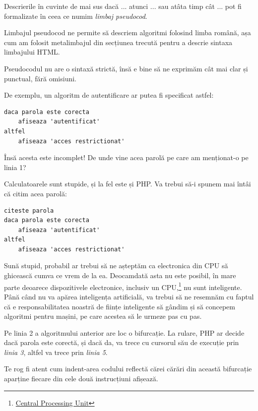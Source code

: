 Descrierile în cuvinte de mai sus {\glqq}dacă ... atunci ...{\grqq}
sau {\glqq}atâta timp cât ...{\grqq} pot fi formalizate în ceea
ce numim \textsl{limbaj pseudocod}. 

Limbajul pseudocod ne permite să descriem algoritmi
folosind limba română, așa cum am folosit metalimbajul
din secțiunea trecută pentru a descrie sintaxa limbajului HTML.

Pseudocodul nu are o sintaxă strictă, însă e bine să
ne exprimăm cât mai clar și punctual, fără omisiuni.

De exemplu, un algoritm de autentificare ar putea
fi specificat astfel:
\begin{lstlisting}[language=pseudocod]
daca parola este corecta
	afiseaza 'autentificat'
altfel
	afiseaza 'acces restrictionat'
\end{lstlisting}
Însă acesta este incomplet! De unde vine
acea {\glqq}parolă{\grqq} pe care am menționat-o pe linia 1?

Calculatoarele sunt stupide, și la fel este și PHP. Va
trebui să-i spunem mai întâi că citim acea parolă:
\begin{lstlisting}[language=pseudocod]
citeste parola
daca parola este corecta
	afiseaza 'autentificat'
altfel
	afiseaza 'acces restrictionat'
\end{lstlisting}

Sună stupid, probabil ar trebui să ne așteptăm
ca electronica din CPU să ghicească cumva
ce vrem de la ea. Deocamdată asta nu este posibil,
în mare parte deoarece dispozitivele electronice,
inclusiv un
CPU,\footnote{\href{http://en.wikipedia.org/wiki/Central_processing_unit}{Central Processing Unit}} nu sunt inteligente.
Până când nu va apărea inteligența artificială,
va trebui să ne resemnăm cu faptul că e responsabilitatea
noastră de ființe inteligente să gândim și să
concepem algoritmi pentru mașini, pe care
acestea să le urmeze pas cu pas.

Pe linia 2 a algoritmului anterior are loc o bifurcație.
La rulare, PHP ar decide dacă {\glqq}parola este corectă{\grqq}, și dacă
da, va trece cu cursorul său {\glqq}de execuție{\grqq} prin \textit{linia 3},
altfel va trece prin \textit{linia 5}. 

Te rog fi atent cum indent-area codului reflectă cărei {\glqq}cărări{\grqq}
din această bifurcație aparține fiecare din cele două instrucțiuni
{\glqq}afișează{\grqq}.

